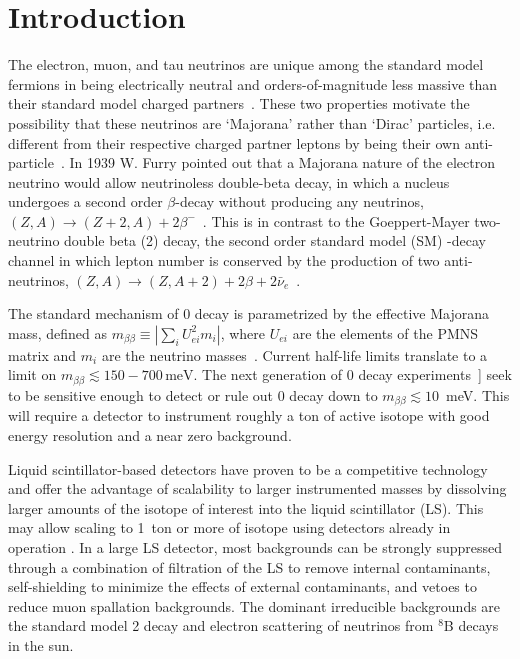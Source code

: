 \section{Introduction}

The electron, muon, and tau neutrinos are unique among the standard
model fermions in being electrically neutral and orders-of-magnitude
less massive than their standard model charged
partners~\cite{PDG_mass}.  These two properties motivate the
possibility that these neutrinos are `Majorana' rather than `Dirac'
particles, i.e. different from their respective charged partner
leptons by being their own
anti-particle~\cite{Majorana1937,pdg_vogel_piepke}. In 1939 W. Furry
pointed out that a Majorana nature of the electron neutrino would
allow neutrinoless double-beta decay, in which a nucleus undergoes a
second order $\beta$-decay without producing any neutrinos,
$(Z,A)\rightarrow(Z+2,A)+2\beta^-$~\cite{Furry1939}.  This is in
contrast to the Goeppert-Mayer two-neutrino double beta (2{\nbb})
decay, the second order standard model (SM) \bmd-decay channel in which
lepton number is conserved by the production of two anti-neutrinos,
\mbox{$(Z,A)\rightarrow(Z,A+2)+2\beta+2\bar\nu_e$}~\cite{GoeppertMayer1935}.

The standard mechanism of 0{\nbb} decay is parametrized by the
effective Majorana mass, defined as
\mbox{$m_{\beta\beta}\equiv\left|\sum_i U^2_{ei}m_i\right|$}, where
$U_{ei}$ are the elements of the PMNS matrix and $m_i$ are the
neutrino masses~\cite{pdg_vogel_piepke}. Current half-life limits
translate to a limit on \mbox{$m_{\beta\beta}\lesssim
150-700\,\mathrm{meV}$}.  The next generation of 0{\nbb} decay
experiments~]\cite{pdg_vogel_piepke} seek to be sensitive enough to
detect or rule out 0{\nbb} decay down to \mbox{$m_{\beta\beta}\lesssim
10$~meV}. This will require a detector to instrument roughly a ton of
active isotope with good energy resolution and a near zero background.

Liquid scintillator-based detectors have proven to be a competitive
technology~\cite{KamLANDZen2013} and offer the advantage of
scalability to larger instrumented masses by dissolving larger amounts
of the isotope of interest into the liquid scintillator (LS).  This
may allow scaling to 1~ton or more of isotope using detectors already
in operation \cite{Biller2013}.  In a large LS detector, most
backgrounds can be strongly suppressed through a combination of
filtration of the LS to remove internal contaminants, self-shielding
to minimize the effects of external contaminants, and vetoes to reduce
muon spallation backgrounds. The dominant irreducible backgrounds are
the standard model 2{\nbb} decay and electron scattering of 
neutrinos from $^8$B decays in the sun.

